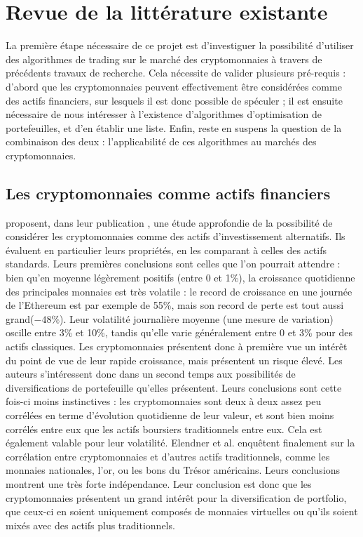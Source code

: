 \documentclass[a4paper, 10pt]{article}
\begin{document}
\newpage
\section{Revue de la littérature existante}
\label{sec:review}

La première étape nécessaire de ce projet est d'investiguer la possibilité d'utiliser des algorithmes de trading sur le marché des cryptomonnaies à travers de précédents travaux de recherche. Cela nécessite de valider plusieurs pré-requis : d'abord que les cryptomonnaies peuvent effectivement être considérées comme des actifs financiers, sur lesquels il est donc possible de spéculer ; il est ensuite nécessaire de nous intéresser à l'existence d’algorithmes d'optimisation de portefeuilles, et d'en établir une liste. Enfin, reste en suspens la question de la combinaison des deux : l'applicabilité de ces algorithmes au marchés des cryptomonnaies.

\subsection{Les cryptomonnaies comme actifs financiers}
\label{sec:review_actifs}

\textbf{\citet{Elendner2018}} proposent, dans leur publication \textbf{}, une étude approfondie de la possibilité de considérer les cryptomonnaies comme des actifs d'investissement alternatifs. Ils évaluent en particulier leurs propriétés, en les comparant à celles des actifs standards. Leurs premières conclusions sont celles que l'on pourrait attendre : bien qu'en moyenne légèrement positifs (entre 0 et 1\%), la croissance quotidienne des principales monnaies est très volatile : le record de croissance en une journée de l'Ethereum est par exemple de 55\%, mais son record de perte est tout aussi grand($-48\%$). Leur volatilité journalière moyenne (une mesure de variation) oscille entre 3\% et 10\%, tandis qu'elle varie généralement entre 0 et 3\% pour des actifs classiques. Les cryptomonnaies présentent donc à première vue un intérêt du point de vue de leur rapide croissance, mais présentent un risque élevé. Les auteurs s'intéressent donc dans un second temps aux possibilités de diversifications de portefeuille qu'elles présentent. Leurs conclusions sont cette fois-ci moins instinctives : les cryptomonnaies sont deux à deux assez peu corrélées en terme d'évolution quotidienne de leur valeur, et sont bien moins corrélés entre eux que les actifs boursiers traditionnels entre eux. Cela est également valable pour leur volatilité. Elendner et al. enquêtent finalement sur la corrélation entre cryptomonnaies et d'autres actifs traditionnels, comme les monnaies nationales, l'or, ou les bons du Trésor américains. Leurs conclusions montrent une très forte indépendance. Leur conclusion est donc que les cryptomonnaies présentent un grand intérêt pour la diversification de portfolio, que ceux-ci en soient uniquement composés de monnaies virtuelles ou qu'ils soient mixés avec des actifs plus traditionnels.
\end{document}
